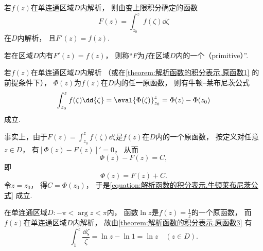 \begin{corollary}\label{theorem:解析函数的积分表示.原函数2}
若\(f(z)\)在单连通区域\(D\)内解析，
则由变上限积分确定的函数\begin{equation*}
	F(z) = \int_{z_0}^z f(\zeta) \dd{\zeta}
\end{equation*}在\(D\)内解析，
且\(F'(z) = f(z)\).
\end{corollary}

\begin{definition}
若在区域\(D\)内有\(F'(z)=f(z)\)，
则称“\(F\)为\(f\)在区域\(D\)内的一个（primitive）”.
\end{definition}

\begin{corollary}\label{theorem:解析函数的积分表示.原函数3}
若\(f(z)\)在单连通区域\(D\)内解析
（或在\cref{theorem:解析函数的积分表示.原函数1} 的前提条件下），
\(\Phi(z)\)为\(f(z)\)在\(D\)内的任一原函数，
则有牛顿--莱布尼茨公式
\begin{equation}\label{equation:解析函数的积分表示.牛顿莱布尼茨公式}
	\int_{z_0}^z f(\zeta) \dd{\zeta}
	= \eval{\Phi(\zeta)}_{z_0}^z
	= \Phi(z)-\Phi(z_0)
\end{equation}成立.
\end{corollary}
事实上，由于\(F(z) = \int_{z_0}^z f(\zeta) \dd{\zeta}\)是\(f(z)\)在\(D\)内的一个原函数，
按定义对任意\(z \in D\)，
有\([\Phi(z) - F(z)]'=0\)，
从而\begin{equation*}
	\Phi(z) - F(z) = C,
\end{equation*}
即\begin{equation*}
	\Phi(z) = F(z) + C.
\end{equation*}
令\(z=z_0\)，
得\(C = \Phi(z_0)\)，
于是\cref{equation:解析函数的积分表示.牛顿莱布尼茨公式} 成立.

\begin{example}
在单连通区域\(D: -\pi<\arg z<\pi\)内，
函数\(\ln z\)是\(f(z) = \frac{1}{z}\)的一个原函数，
而\(f(z)\)在单连通区域\(D\)内解析，
故由\cref{theorem:解析函数的积分表示.原函数3} 有\begin{equation*}
	\int_1^z \frac{\dd{\zeta}}{\zeta}
	= \ln z - \ln 1
	= \ln z \quad(z \in D).
\end{equation*}
\end{example}

